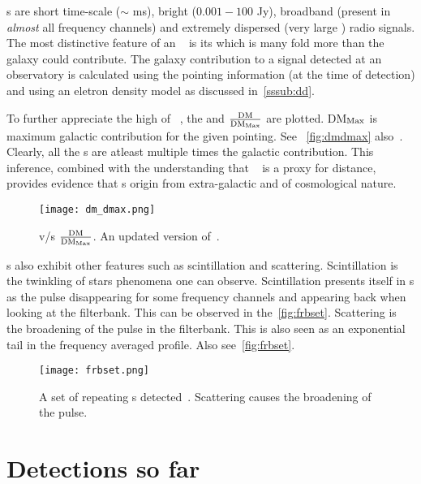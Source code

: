 \par \frb s are short time-scale ($\sim$ ms), bright ($0.001 - 100$ Jy), broadband (present in \emph{almost} all frequency channels) and extremely dispersed (very large \dm) radio signals. 
The most distinctive feature of an \frb{}~ is its \dm which is many fold more than the galaxy could contribute. The galaxy contribution to a signal detected at an observatory is calculated using the pointing information (at the time of detection) and using an eletron density model as discussed in~\autoref{sssub:dd}.

\par To further appreciate the high \dm of \frb{}~, the \dm and $\frac{\rm DM}{{\rm DM}_{\rm Max}}$ are plotted. DM$_{\rm Max}$ is maximum galactic contribution for the given pointing. See ~\autoref{fig:dmdmax} also~\cite{petroff_survey, palfa_frb}. Clearly, all the \frb{}s are atleast multiple times the galactic contribution. This inference, combined with the understanding that \dm~ is a proxy for distance, provides evidence that \frb{}s origin from extra-galactic and of cosmological nature.

\begin{figure}
\label{fig:dmdmax}
	\centering
	\texttt{[image: dm\_dmax.png]}
\caption{\dm v/s $\frac{\rm DM}{{\rm DM}_{\rm Max}}$. An updated version of~\cite{petroff_survey, palfa_frb}.}
\end{figure}

\par \frb{}s also exhibit other features such as scintillation and scattering. Scintillation is the twinkling of stars phenomena one can observe. 
Scintillation presents itself in \frb{}s as the pulse disappearing for some frequency channels and appearing back when looking at the filterbank. This can be observed in the~\autoref{fig:frbset}. 
Scattering is the broadening of the pulse in the filterbank. This is also seen as an exponential tail in the frequency averaged profile.
Also see~\autoref{fig:frbset}.

\begin{figure}
	\label{fig:frbset}
	\centering
	\texttt{[image: frbset.png]}
	\caption{A set of repeating \frb{}s detected~\cite{chime_repeater9}. Scattering causes the broadening of the pulse.}
\end{figure}

\section{Detections so far}
\label{sec:detect_so_far}

